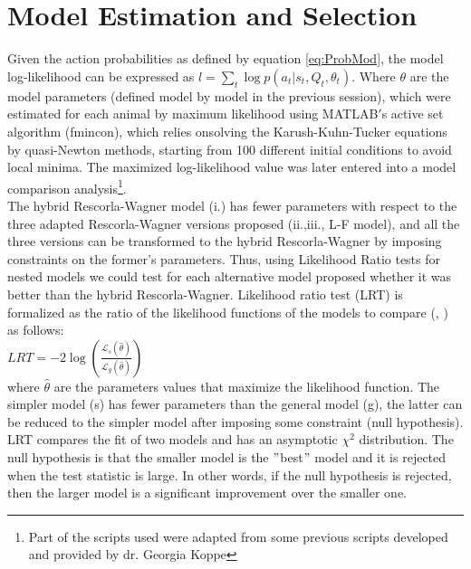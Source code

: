 \section{Model Estimation and Selection}
\label{sec:Behavior}
Given the action probabilities as defined by equation \ref{eq:ProbMod}, the model log-likelihood can be expressed as $l=\sum_{t} \log p(a_t|s_t,Q_t,\theta_t)$. Where $\theta$ are the model parameters (defined model by model in the previous session), which were estimated for each animal by maximum likelihood using MATLAB$'$s active set algorithm (fmincon), which relies onsolving the Karush-Kuhn-Tucker equations by quasi-Newton methods, starting from 100 different initial conditions to avoid local minima. The maximized log-likelihood value was later entered into a model comparison analysis\footnote{Part of the scripts used were adapted from some previous scripts developed and provided by dr. Georgia Koppe}.\\
The hybrid Rescorla-Wagner model (i.) has fewer parameters with respect to the three adapted Rescorla-Wagner versions proposed (ii.,iii., L-F model), and all the three versions can be transformed to the hybrid Rescorla-Wagner by imposing constraints on the former's parameters. Thus, using Likelihood Ratio tests for nested models we could test for each alternative model proposed whether it was better than the hybrid Rescorla-Wagner. Likelihood ratio test (LRT) is formalized as the ratio of the likelihood functions of the models to compare (\cite{NeymanPearson}, \cite{King}) as follows:\\
 \hspace{5cm} $LRT = -2 \log (\frac{\mathcal{L}_s(\hat{\theta})}{\mathcal{L}_g(\hat{\theta})})$\\
where $\hat{\theta}$ are the parameters values that maximize the likelihood function.
The simpler model (s) has fewer parameters than the general model (g), the latter can be reduced to the simpler model after imposing some constraint (null hypothesis).\\
LRT compares the fit of two models and has an asymptotic $\chi^2$ distribution. The null hypothesis is that the smaller model is the $"$best$"$ model and it is rejected when the test statistic is large. In other words, if the null hypothesis is rejected, then the larger model is a significant improvement over the smaller one.\\
